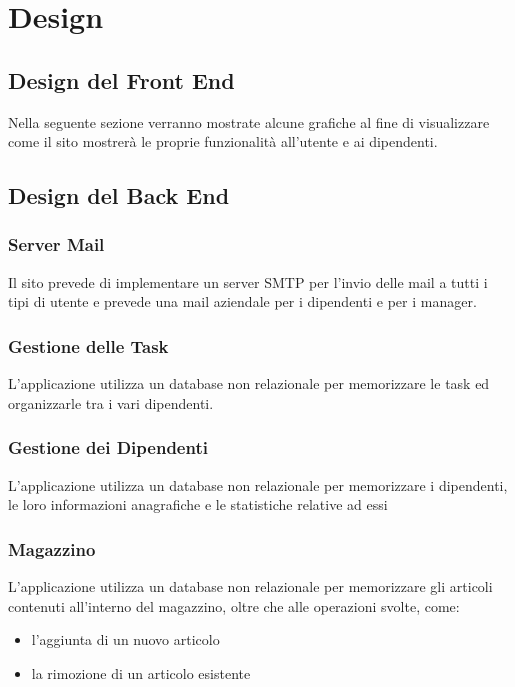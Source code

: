 \documentclass{report}
\begin{document}
\chapter{Design}

\section{Design del Front End}

Nella seguente sezione verranno mostrate alcune grafiche al fine di visualizzare come il sito mostrerà le proprie funzionalità all’utente e ai dipendenti.


\section{Design del Back End}

\subsection*{Server Mail}
Il sito prevede di implementare un server SMTP per l’invio delle mail a tutti i tipi di utente e prevede una mail aziendale per i dipendenti e per i manager.

\subsection*{Gestione delle Task}
L’applicazione utilizza un database non relazionale per memorizzare le task ed organizzarle tra i vari dipendenti.

\subsection*{Gestione dei Dipendenti}
L’applicazione utilizza un database non relazionale per memorizzare i dipendenti, le loro informazioni anagrafiche e le statistiche relative ad essi

\subsection*{Magazzino}
L’applicazione utilizza un database non relazionale per memorizzare gli articoli contenuti all’interno del magazzino, oltre che alle operazioni svolte, come:

\begin{itemize}
	\item l’aggiunta di un nuovo articolo
	
	\item la rimozione di un articolo esistente
\end{itemize}
\end{document}
